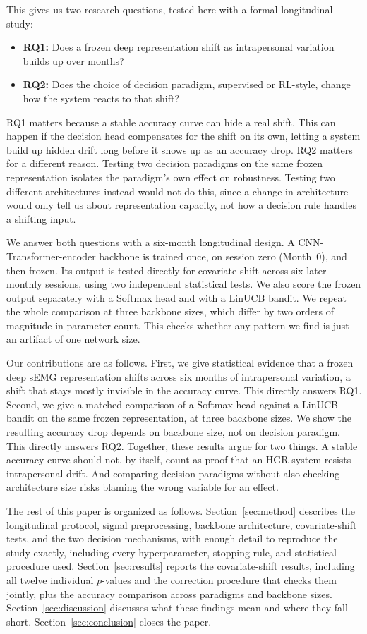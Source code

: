 \documentclass[journal]{IEEEtran}
\begin{document}
This gives us two research questions, tested here with a formal longitudinal study:
\begin{itemize}
\item \textbf{RQ1:} Does a frozen deep representation shift as intrapersonal variation builds up over months?
\item \textbf{RQ2:} Does the choice of decision paradigm, supervised or RL-style, change how the system reacts to that shift?
\end{itemize}
RQ1 matters because a stable accuracy curve can hide a real shift. This can happen if the decision head compensates for the shift on its own, letting a system build up hidden drift long before it shows up as an accuracy drop. RQ2 matters for a different reason. Testing two decision paradigms on the same frozen representation isolates the paradigm's own effect on robustness. Testing two different architectures instead would not do this, since a change in architecture would only tell us about representation capacity, not how a decision rule handles a shifting input.

We answer both questions with a six-month longitudinal design. A CNN-Transformer-encoder backbone is trained once, on session zero (Month~0), and then frozen. Its output is tested directly for covariate shift across six later monthly sessions, using two independent statistical tests. We also score the frozen output separately with a Softmax head and with a LinUCB bandit. We repeat the whole comparison at three backbone sizes, which differ by two orders of magnitude in parameter count. This checks whether any pattern we find is just an artifact of one network size.

Our contributions are as follows. First, we give statistical evidence that a frozen deep sEMG representation shifts across six months of intrapersonal variation, a shift that stays mostly invisible in the accuracy curve. This directly answers RQ1. Second, we give a matched comparison of a Softmax head against a LinUCB bandit on the same frozen representation, at three backbone sizes. We show the resulting accuracy drop depends on backbone size, not on decision paradigm. This directly answers RQ2. Together, these results argue for two things. A stable accuracy curve should not, by itself, count as proof that an HGR system resists intrapersonal drift. And comparing decision paradigms without also checking architecture size risks blaming the wrong variable for an effect.

The rest of this paper is organized as follows. Section~\ref{sec:method} describes the longitudinal protocol, signal preprocessing, backbone architecture, covariate-shift tests, and the two decision mechanisms, with enough detail to reproduce the study exactly, including every hyperparameter, stopping rule, and statistical procedure used. Section~\ref{sec:results} reports the covariate-shift results, including all twelve individual $p$-values and the correction procedure that checks them jointly, plus the accuracy comparison across paradigms and backbone sizes. Section~\ref{sec:discussion} discusses what these findings mean and where they fall short. Section~\ref{sec:conclusion} closes the paper.
\end{document}
